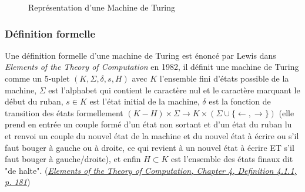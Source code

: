\documentclass[11pt,colorlinks=true,a4paper]{article}
\begin{document}
\begin{figure}[H]
            \caption{Représentation d'une Machine de Turing}
            \end{figure}

        \subsubsection{Définition formelle}
        Une définition formelle d'une machine de Turing est énoncé par Lewis dans \textit{Elements of the Theory of Computation} en 1982, il définit une machine de Turing 
        comme un 5-uplet $(K,\Sigma,\delta,s,H)$ avec $K$ l'ensemble fini d'états possible de la machine, $\Sigma$ est l'alphabet qui contient 
        le caractère nul et le caractère marquant le début du ruban, $s \in K$ est l'état initial de la machine, $\delta$ est la fonction 
        de transition des états formellement $(K - H) \times \Sigma \to K \times (\Sigma \cup \{\leftarrow,\rightarrow\})$
        (elle prend en entrée un couple formé d'un état non sortant et d'un état du ruban lu et 
        renvoi un couple du nouvel état de la machine et du nouvel état à écrire ou s'il faut bouger à gauche ou à droite, ce qui 
        revient à un nouvel état à écrire ET s'il faut bouger à gauche/droite), et enfin $H \subset K$ est l'ensemble des états 
        finaux dit "de halte". (\href{https://www.awa2el.net/sites/default/files/nzry_hsbt_ltb_lthny.pdf}{\textit{Elements of the Theory of Computation, Chapter 4, Definition 4.1.1, p. 181}})\newline
\end{document}
